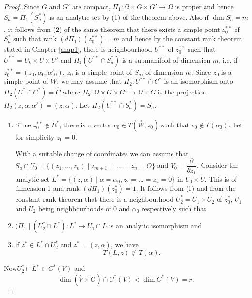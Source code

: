 \begin{proof} %
  Since $G$ and $G'$ are compact, $\Pi_1 : \Omega \times G \times G'
  \to \Omega$ is proper and hence $S_a = \Pi_1 (S^*_a)$ is an
  analytic set by (1) of the theorem above. Also if $\dim S_a = m$,
  it follows from (2) of the same theorem that there exists a simple
  point $z^{**}_0$ of $S^*_a$ such that rank $(d\Pi_1)(z^{**}_0)
  = m$ and hence by the constant rank theorem stated in Chapter \ref{chap1},
  there is neighbourhood $U^{**}$ of $z^{**}_0$ such that $U^{**}
  = U_0 \times U \times U'$ and $\Pi_1 (U^{**}\cap S^*_a)$ is a
  submanifold of dimension $m$, i.e. if $z^{**}_0 =
  (z_0,\alpha_0,\alpha'_0)$, $z_0$ is a simple point of
  $S_a$, of dimension $m$. Since $z_0$ is a simple point of $W$,
  we may assume that $\Pi_2 : U^{**}\cap C^*$ is an isomorphism onto
  $\Pi_2 (U^* \cap C^*) = \widehat{C}$ where $\Pi_2 : \Omega \times G
  \times G'\to \Omega \times G$ is the projection $\Pi_2
  (z,\alpha,\alpha') = (z,\alpha)$. Let $\Pi_2(U^{**}\cap S^*_a) =
  \widetilde{S}_a$. 
\begin{enumerate}[(1)]
\item Since $z^{**}_0 \notin R^*$, there is a vector
  $v_0 \in T(\overset{\circ}{W},z_0)$ such that $v_0
  \notin T(\alpha_0)$. Let for simplicity $z_0 = 0$. 
  
  With a suitable change of coordinates we can assume that $S_a \cap
  U_0 = \{(z_1,\ldots,z_n)\mid z_{m+1} =\ldots= z_n =
  O\}$ and $V_0 = \dfrac{\partial}{\partial z_1}$. Consider
  the analytic set $L^*= \{(z,\alpha)\mid \alpha=\alpha_0,
  z_2 = \ldots = z_n = 0\}$ in $U_0 \times U$. This is of
  dimension 1 and rank $(d\Pi_1)(z^*_0) = 1$. It follows from
  (1) and from the constant rank theorem that there is a
  neighbourhood $U^*_2 = U_1\times U_2$ of $z^*_0$, $U_1$ and $U_2$
  being neighbourhoods of $0$ and $\alpha_0$ respectively such
  that 

\item $(\Pi_1 \mid (U^*_2 \cap L^*) : L^*\to U_1 \cap
  L$ is an analytic isomorphism and 
 
\item if $z^* \in L^* \cap U^*_2$ and $z^* = (z,\alpha)$, we have 
  $$
  T(L,z) \not\subset T(\alpha). 
  $$
\end{enumerate}

Now\pageoriginale $U^*_2 \cap L^* \subset C^*(V)$ and 
$$
\dim (\overset{.}{V}\times G) \cap C^* (V)< \dim C^*(V) = r.
$$


\end{proof}
